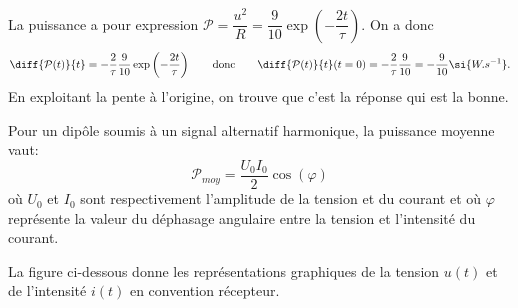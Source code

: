 \reponse{\reponseC{}} 

\begin{corrige}
La puissance a pour expression $\mathcal{P}=\dfrac{u^{2}}{R}=\dfrac{9}{10}\exp\left(-\dfrac{2t}{\tau}\right)$. On a donc
\[
\diff{\mathcal{P}(t)}{t} = -\frac{2}{\tau}\dfrac{9}{10}\exp\left(-\dfrac{2t}{\tau}\right)
\qquad\text{donc}\qquad
\diff{\mathcal{P}(t)}{t}(t=0) = -\frac{2}{\tau}\dfrac{9}{10} = - \dfrac{9}{10} \si{W.s^{-1}}.
\] 
En exploitant la pente à l'origine, on trouve que c'est la réponse \reponseC{} qui est la bonne.
\end{corrige}



\finEntrainement














\hauteurLargeurCadreReponse		{8mm}{3.5cm}
\typeEntrainement				{} %
\initialisationEntrainement



Pour un dipôle soumis à un signal alternatif harmonique, la puissance moyenne vaut:
\[
\mathcal{P}_{moy}=\dfrac{U_{0}I_{0}}{2}\cos(\varphi)
\]
où $U_{0}$ et $I_{0}$ sont respectivement l'amplitude de la tension et du courant et où $\varphi$ représente la valeur du déphasage angulaire entre la tension et l'intensité du courant. 

La figure ci-dessous donne les représentations graphiques de la tension $u(t)$ et de l'intensité $i(t)$ en convention récepteur. 

